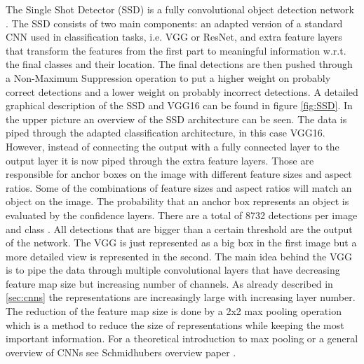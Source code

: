 The Single Shot Detector (SSD) is a fully convolutional object detection network \cite{SSD}. The SSD consists of two main components: an adapted version of a standard CNN used in classification tasks, i.e. VGG or ResNet, and extra feature layers that transform the features from the first part to meaningful information w.r.t. the final classes and their location. The final detections are then pushed through a Non-Maximum Suppression operation to put a higher weight on probably correct detections and a lower weight on probably incorrect detections. 
A detailed graphical description of the SSD and VGG16 can be found in figure \ref{fig:SSD}. In the upper picture an overview of the SSD architecture can be seen. The data is piped through the adapted classification architecture, in this case VGG16. However, instead of connecting the output with a fully connected layer to the output layer it is now piped through the extra feature layers. Those are responsible for anchor boxes on the image with different feature sizes and aspect ratios. Some of the combinations of feature sizes and aspect ratios will match an object on the image. The probability that an anchor box represents an object is evaluated by the confidence layers. There are a total of 8732 detections per image and class . All detections that are bigger than a certain threshold are the output of the network. The VGG is just represented as a big box in the first image but a more detailed view is represented in the second. The main idea behind the VGG is to pipe the data through multiple convolutional layers that have decreasing feature map size but increasing number of channels. As already described in \ref{sec:cnns} the representations are increasingly large with increasing layer number. The reduction of the feature map size is done by a 2x2 max pooling operation which is a method to reduce the size of representations while keeping the most important information. For a theoretical introduction to max pooling or a general overview of CNNs see Schmidhubers overview paper \cite{SchmidhuberOverview}. 

